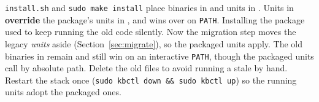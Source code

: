 \begin{kbnote}
\texttt{install.sh} and \texttt{sudo make install} place binaries in  and units in
. Units in  \textbf{override} the package's units in
, and  wins over  on \texttt{PATH}. Installing the
package used to keep running the old code silently. Now the migration step moves the legacy \emph{units} aside
(Section~\ref{sec:migrate}), so the packaged units apply. The old binaries in  remain and still
win on an interactive \texttt{PATH}, though the packaged units call  by absolute path. Delete the
old  files to avoid running a stale  by hand. Restart the stack once
(\texttt{sudo kbctl down \&\& sudo kbctl up}) so the running units adopt the packaged ones.
\end{kbnote}
